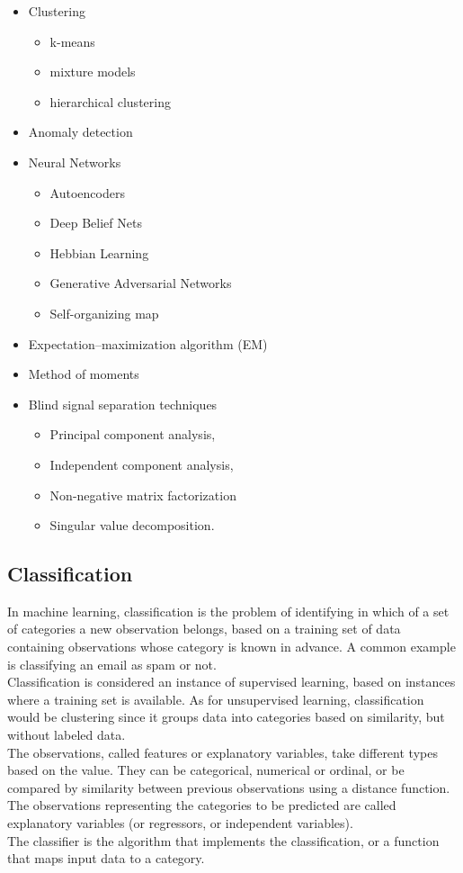 \begin{itemize}[noitemsep]
	\item Clustering
	\begin{itemize}[noitemsep]
		\item k-means
		\item mixture models
		\item hierarchical clustering
	\end{itemize}
	\item Anomaly detection
	\item Neural Networks
	\begin{itemize}[noitemsep]
		\item Autoencoders
		\item Deep Belief Nets
		\item Hebbian Learning
		\item Generative Adversarial Networks
		\item Self-organizing map
	\end{itemize}
	\item Expectation–maximization algorithm (EM)
	\item Method of moments
	\item Blind signal separation techniques
	\begin{itemize}[noitemsep]
		\item Principal component analysis,
		\item Independent component analysis,
		\item Non-negative matrix factorization
		\item Singular value decomposition.
	\end{itemize}
\end{itemize}

\subsection{Classification} \label{classification}
In machine learning, classification is the problem of identifying in which of a set of categories a new observation belongs, based on a training set of data containing observations whose category is known in advance. A common example is classifying an email as spam or not.\\
Classification is considered an instance of supervised learning, based on instances where a training set is available. As for unsupervised learning, classification would be clustering since it groups data into categories based on similarity, but without labeled data.\\
The observations, called features or explanatory variables, take different types based on the value. They can be categorical, numerical or ordinal, or be compared by similarity between previous observations using a distance function.\\
The observations representing the categories to be predicted are called explanatory variables (or regressors, or independent variables).\\
The classifier is the algorithm that implements the classification, or a function that maps input data to a category.

